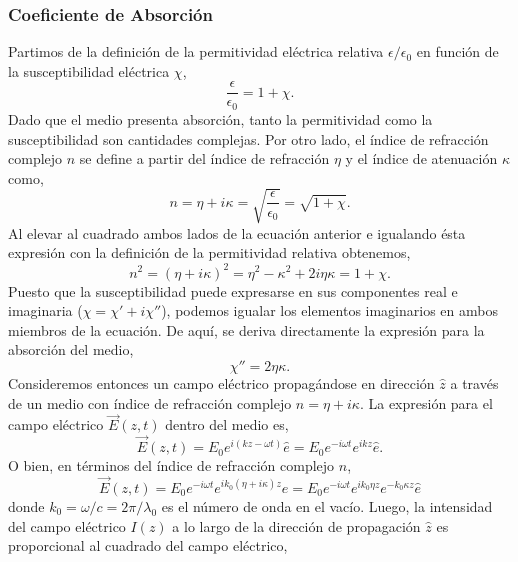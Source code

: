 \subsubsection{Coeficiente de Absorción}
Partimos de la definición de la permitividad eléctrica relativa $\epsilon / \epsilon_0$ en función de la susceptibilidad eléctrica $\chi$,
\begin{equation}
    \frac{\epsilon}{\epsilon_0} = 1 + \chi.
\end{equation}
Dado que el medio presenta absorción, tanto la permitividad como la susceptibilidad son cantidades complejas. Por otro lado, el índice de refracción complejo $n$ se define a partir del índice de refracción $\eta$ y el índice de atenuación $\kappa$ como,
\begin{equation}
    n = \eta + i \kappa = \sqrt{\frac{\epsilon}{\epsilon_0}} = \sqrt{1 + \chi}.
\end{equation}
Al elevar al cuadrado ambos lados de la ecuación anterior e igualando ésta expresión con la definición de la permitividad relativa obtenemos,
\begin{equation}
    n^2 = (\eta + i \kappa)^2 = \eta^2 - \kappa^2 + 2 i \eta \kappa = 1 + \chi.
\end{equation}
Puesto que la susceptibilidad puede expresarse en sus componentes real e imaginaria ($\chi = \chi' + i \chi''$), podemos igualar los elementos imaginarios en ambos miembros de la ecuación. De aquí, se deriva directamente la expresión para la absorción del medio,
\begin{equation}
    \chi'' = 2 \eta \kappa.
\end{equation}
Consideremos entonces un campo eléctrico propagándose en dirección $\hat{z}$ a través de un medio con índice de refracción complejo $n = \eta + i \kappa$. La expresión para el campo eléctrico $\vec{E}(z,t)$ dentro del medio es,
\begin{equation}
    \vec{E}(z,t) = E_0 e^{i(kz - \omega t)} \hat{e} = E_0 e^{-i \omega t} e^{i k z} \hat{e}.
\end{equation}
O bien, en términos del índice de refracción complejo $n$,
\begin{equation}
    \vec{E}(z,t) = E_0 e^{-i \omega t} e^{i k_0 (\eta + i \kappa) z} \hat{e} = E_0 e^{-i \omega t} e^{i k_0 \eta z} e^{- k_0 \kappa z} \hat{e}
\end{equation}
donde $k_0 = \omega / c = 2 \pi / \lambda_0$ es el número de onda en el vacío. Luego, la intensidad del campo eléctrico $I(z)$ a lo largo de la dirección de propagación $\hat{z}$ es proporcional al cuadrado del campo eléctrico,
